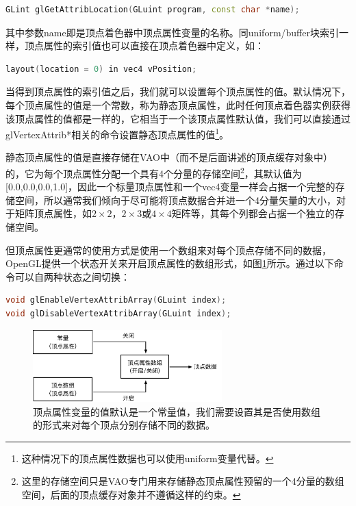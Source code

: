 \begin{lstlisting}[language=C++]
GLint glGetAttribLocation​(GLuint program​, const char *name​);
\end{lstlisting}

其中参数name即是顶点着色器中顶点属性变量的名称。同uniform/buffer块索引一样，顶点属性的索引值也可以直接在顶点着色器中定义，如：

\begin{lstlisting}[language=C++]
layout(location = 0) in vec4 vPosition;
\end{lstlisting}

当得到顶点属性的索引值之后，我们就可以设置每个顶点属性的值。默认情况下，每个顶点属性的值是一个常数，称为静态顶点属性，此时任何顶点着色器实例获得该顶点属性的值都是一样的，它相当于一个该顶点属性默认值，我们可以直接通过glVertexAttrib*相关的命令设置静态顶点属性的值\footnote{这种情况下的顶点属性数据也可以使用uniform变量代替。}。

静态顶点属性的值是直接存储在VAO中（而不是后面讲述的顶点缓存对象中）的，它为每个顶点属性分配一个具有4个分量的存储空间\footnote{这里的存储空间只是VAO专门用来存储静态顶点属性预留的一个4分量的数组空间，后面的顶点缓存对象并不遵循这样的约束。}，其默认值为[0.0,0.0,0.0,1.0]，因此一个标量顶点属性和一个vec4变量一样会占据一个完整的存储空间，所以通常我们倾向于尽可能将顶点数据合并进一个4分量矢量的大小，对于矩阵顶点属性，如$2\times 2$，$2\times 3$或$4\times 4$矩阵等，其每个列都会占据一个独立的存储空间。

但顶点属性更通常的使用方式是使用一个数组来对每个顶点存储不同的数据，OpenGL提供一个状态开关来开启顶点属性的数组形式，如图\ref{f:api-vertex-array}所示。​通过以下命令可以自两种状态之间切换：

\begin{lstlisting}[language=C++]
void glEnableVertexAttribArray(GLuint index​);
void glDisableVertexAttribArray(GLuint index​);
\end{lstlisting}

\begin{figure}
	\sidecaption
	\includegraphics[width=0.65\textwidth]{figures/api/vertex}
	\caption{顶点属性变量的值默认是一个常量值，我们需要设置其是否使用数组的形式来对每个顶点分别存储不同的数据。}
	\label{f:api-vertex-array}
\end{figure}





